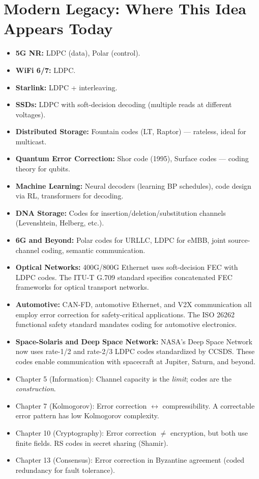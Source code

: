 \section{Modern Legacy: Where This Idea Appears Today}
\label{sec:ec:legacy}

\begin{itemize}
\item \textbf{5G NR:} LDPC (data), Polar (control).
\item \textbf{WiFi 6/7:} LDPC.
\item \textbf{Starlink:} LDPC + interleaving.
\item \textbf{SSDs:} LDPC with soft-decision decoding (multiple reads at different voltages).
\item \textbf{Distributed Storage:} Fountain codes (LT, Raptor) — rateless, ideal for multicast.
\item \textbf{Quantum Error Correction:} Shor code (1995), Surface codes — coding theory for qubits.
\item \textbf{Machine Learning:} Neural decoders (learning BP schedules), code design via RL, transformers for decoding.
\item \textbf{DNA Storage:} Codes for insertion/deletion/substitution channels (Levenshtein, Helberg, etc.).
\item \textbf{6G and Beyond:} Polar codes for URLLC, LDPC for eMBB, joint source-channel coding, semantic communication.
\item \textbf{Optical Networks:} 400G/800G Ethernet uses soft-decision FEC with LDPC codes. The ITU-T G.709 standard specifies concatenated FEC frameworks for optical transport networks.
\item \textbf{Automotive:} CAN-FD, automotive Ethernet, and V2X communication all employ error correction for safety-critical applications. The ISO 26262 functional safety standard mandates coding for automotive electronics.
\item \textbf{Space-Solaris and Deep Space Network:} NASA's Deep Space Network now uses rate-1/2 and rate-2/3 LDPC codes standardized by CCSDS. These codes enable communication with spacecraft at Jupiter, Saturn, and beyond.
\end{itemize}

\begin{itemize}
\item Chapter 5 (Information): Channel capacity is the \emph{limit}; codes are the \emph{construction}.
\item Chapter 7 (Kolmogorov): Error correction $\leftrightarrow$ compressibility. A correctable error pattern has low Kolmogorov complexity.
\item Chapter 10 (Cryptography): Error correction $\neq$ encryption, but both use finite fields. RS codes in secret sharing (Shamir).
\item Chapter 13 (Consensus): Error correction in Byzantine agreement (coded redundancy for fault tolerance).
\end{itemize}

